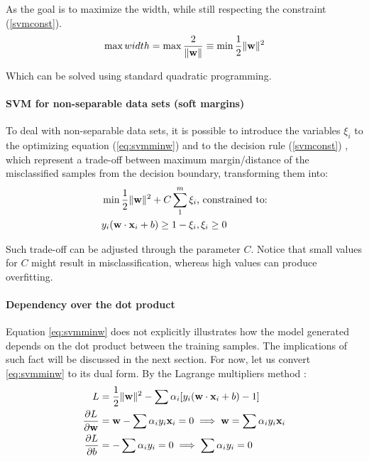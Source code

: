 As the goal is to maximize the width, while still respecting the constraint (\ref{svmconst}).
\begin{equation} \label{eq:svmminw}
	\max width = \max \frac{2}{\|\mathbf{w}\|} \equiv \min \frac{1}{2} \|\mathbf{w}\|^2
\end{equation}

Which can be solved using standard quadratic programming.

\paragraph{SVM for non-separable data sets (soft margins)}

To deal with non-separable data sets, it is possible to introduce the variables $\xi_i$ to the optimizing equation (\ref{eq:svmminw}) and to the decision rule (\ref{svmconst}) \cite{wessvmdef}, which represent a trade-off between maximum margin/distance of the misclassified samples from the decision boundary, transforming them into:
\begin{align*}
	&\min \frac{1}{2} \|\mathbf{w}\|^2 + C \sum_{1}^{m}\xi_i \text{, constrained to:} \\
	&y_i(\mathbf{w} \cdot \mathbf{x}_i +b) \geq 1- \xi_i, \xi_i \geq 0
\end{align*}

Such trade-off can be adjusted through the parameter $C$. Notice that small values for $C$ might result in misclassification, whereas high values can produce overfitting.

\paragraph{Dependency over the dot product}

Equation \ref{eq:svmminw} does not explicitly illustrates how the model generated depends on the dot product between the training samples. The implications of such fact will be discussed in the next section. For now, let us convert \ref{eq:svmminw} to its dual form. By the Lagrange multipliers method \cite{mitsvm}:
\begin{align} \label{eq:svmlag1}
	L &= \frac{1}{2}\|\mathbf{w}\|^2 - \sum \alpha_i[y_i(\mathbf{w} \cdot \mathbf{x}_i +b) -1] \\
	\label{svmlag2}
	\frac{\partial L}{\partial \mathbf{w}} &= \mathbf{w} -\sum\alpha_i y_i \mathbf{x}_i = 0 \implies \mathbf{w} = \sum\alpha_i y_i \mathbf{x}_i \\
	\label{svmlag3}
	\frac{\partial L}{\partial b} &= -\sum\alpha_i y_i = 0 \implies \sum\alpha_i y_i = 0
\end{align}


